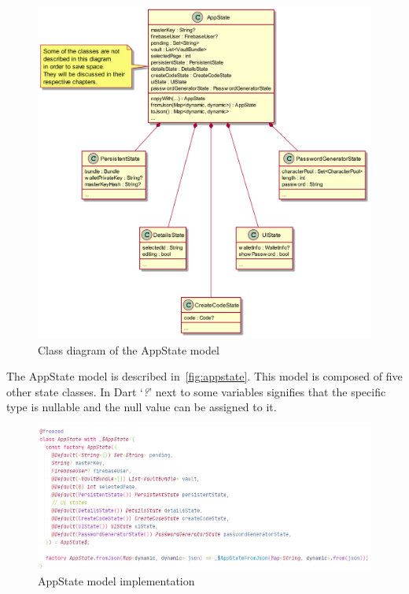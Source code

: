 \documentclass[a4paper,12pt]{report}
\begin{document}
\begin{figure}[H]
    \centering
    \includegraphics[scale=0.33]{diagrams/class/app_state.png}
    \caption{Class diagram of the AppState model}\label{fig:appstate}
\end{figure}

The AppState model is described in~\autoref{fig:appstate}. This model is
composed of five other state classes. In Dart `\textit{?}' next to some
variables signifies that the specific type is nullable and the null value can
be assigned to it.

\begin{figure}[H]
    \centering
    \includegraphics[scale=0.6]{images/code/app_state_model.png}
    \caption{AppState model implementation}\label{fig:app_state_model}
\end{figure}
\end{document}
